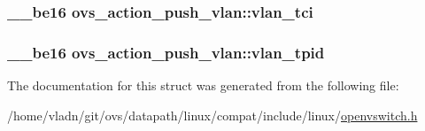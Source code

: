 \subsubsection[{vlan\+\_\+tci}]{\setlength{\rightskip}{0pt plus 5cm}\+\_\+\+\_\+be16 ovs\+\_\+action\+\_\+push\+\_\+vlan\+::vlan\+\_\+tci}\label{structovs__action__push__vlan_ab17c8db02bffc32a072bd23687dd712c}
\hypertarget{structovs__action__push__vlan_af2e36cd70149cf03ebf29586fc765722}{}
\subsubsection[{vlan\+\_\+tpid}]{\setlength{\rightskip}{0pt plus 5cm}\+\_\+\+\_\+be16 ovs\+\_\+action\+\_\+push\+\_\+vlan\+::vlan\+\_\+tpid}\label{structovs__action__push__vlan_af2e36cd70149cf03ebf29586fc765722}


The documentation for this struct was generated from the following file\+:\begin{DoxyCompactItemize}
\item 
/home/vladn/git/ovs/datapath/linux/compat/include/linux/\hyperlink{openvswitch_8h}{openvswitch.\+h}\end{DoxyCompactItemize}

